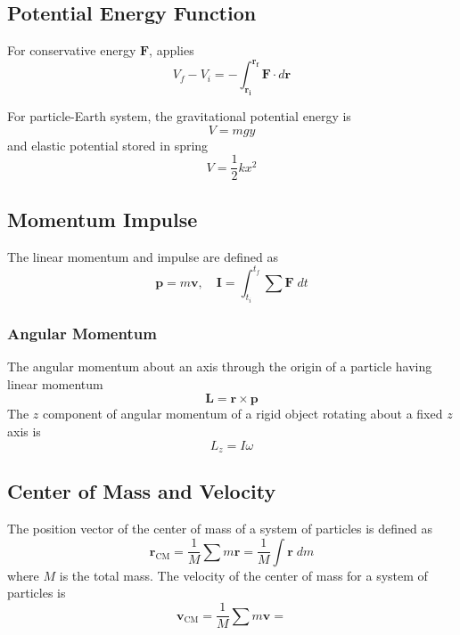 \documentclass[../../../main.tex]{subfiles}
\begin{document}
\subsection*{Potential Energy Function}
For conservative energy $\mathbf{F}$, applies
\begin{equation*}
    V_f-V_i=-\int_{\mathbf{r_i}}^{\mathbf{r_f}}\mathbf{F}\cdot d\mathbf{r}
\end{equation*}

For particle-Earth system, the gravitational potential energy is
\begin{equation*}
    V=mgy
\end{equation*}
and elastic potential stored in spring
\begin{equation*}
    V=\frac{1}{2}kx^2
\end{equation*}

\subsection*{Momentum Impulse}
The linear momentum and impulse are defined as 
\begin{equation*}
    \mathbf{p}=m\mathbf{v},\quad \mathbf{I}=\int_{t_i}^{t_f}\sum \mathbf{F}\;dt
\end{equation*}

\subsubsection*{Angular Momentum} 
The angular momentum about an axis through the origin of a particle having linear momentum
\begin{equation*}
    \mathbf{L}=\mathbf{r}\times \mathbf{p}
\end{equation*}
The $z$ component of angular momentum of a rigid object rotating about a fixed $z$ axis is
\begin{equation*}
    L_z=I\omega
\end{equation*}


\subsection*{Center of Mass and Velocity}
The position vector of the center of mass of a system of particles is defined as
\begin{equation*}
    \mathbf{r}_\text{CM}=\frac{1}{M}\sum m\mathbf{r}=\frac{1}{M}\int \mathbf{r}\;dm
\end{equation*}
where $M$ is the total mass. The velocity of the center of mass for a system of particles is
\begin{equation*}
    \mathbf{v}_\text{CM}=\frac{1}{M}\sum m\mathbf{v}=
\end{equation*}
\end{document}
